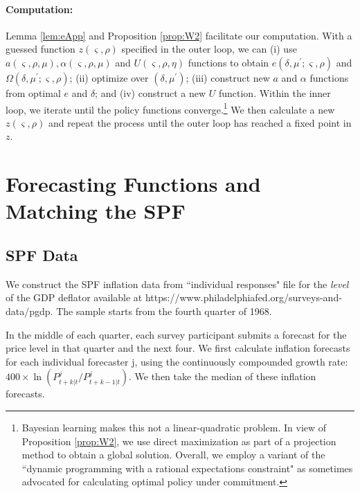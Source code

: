 \documentclass[12pt,letter,leqno]{article}
\theoremstyle{asn}
\theoremstyle{lem}
\theoremstyle{slem}
\theoremstyle{prop}
\theoremstyle{appprop}
\theoremstyle{rem}
\theoremstyle{defn}
\begin{document}
\paragraph{Computation:} Lemma \ref{lem:eApp} and Proposition \ref{prop:W2} facilitate our computation. With a guessed function $z\left(
\varsigma ,\rho \right) $ specified in the outer loop, we can (i) use $a(\varsigma ,\rho ,\mu ),\alpha (\varsigma ,\rho
,\mu )$ and $U(\varsigma,\rho,\eta)$ functions to obtain $e(\delta ,\mu ^{\prime };\varsigma ,\rho )$ and $\Omega(\delta,\mu^{\prime};\varsigma, \rho)$; (ii) optimize over $(\delta ,\mu ^{\prime })$; (iii) construct new $a$ and $\alpha$ functions from optimal $e$ and $\delta$; and (iv) construct a new $U$ function. Within the inner loop, we iterate until the policy functions converge.\footnote{Bayesian learning makes this not a linear-quadratic problem. In view of Proposition \ref{prop:W2}, we use direct maximization as part of a projection method to obtain a global solution. Overall, we employ a variant of the ``dynamic programming with a rational expectations constraint" as sometimes advocated for calculating optimal policy under commitment.}
We then calculate a new $z(\varsigma,\rho)$ and repeat the process until the outer loop has reached a fixed point in $z$.










\section{Forecasting Functions and Matching the SPF}\label{appsec:SPF}

\renewcommand{\theequation}{C\arabic{equation}}


\subsection{SPF Data}
We construct the SPF inflation data from ``individual responses" file for the \textit{level} of the GDP deflator available at https://www.philadelphiafed.org/surveys-and-data/pgdp. The sample starts from the fourth quarter of 1968.

In the middle of each quarter, each survey participant submits a forecast for the price level in that quarter and the next four. We first calculate inflation forecasts for each individual forecaster j, using the continuously compounded growth rate: $400\times\ln(P^j_{t+k|t}/P^j_{t+k-1|t})$. We then take the median of these inflation forecasts.
\end{document}
